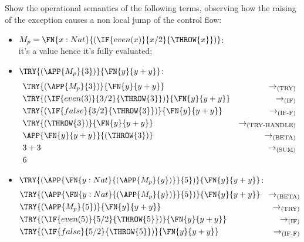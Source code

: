 \subsection{}

Show the operational semantics of the following terms, observing how the raising of the exception causes a
non local jump of the control flow:
\begin{itemize}
	\item $M_p = \FN{x: Nat}{(\IF{even(x)}{x/2}{\THROW{x}})}$:\\
	      it's a value hence it's fully evaluated;
	\item $\TRY{(\APP{M_p}{3})}{\FN{y}{y+y}}$:
	      \begin{align*}
		       & \TRY{(\APP{M_p}{3})}{\FN{y}{y+y}}
		       & \to_{\text{(TRY)}}                                \\
		       & \TRY{(\IF{even(3)}{3/2}{\THROW{3}})}{\FN{y}{y+y}}
		       & \to_{\text{(IF)}}                                 \\
		       & \TRY{(\IF{false}{3/2}{\THROW{3}})}{\FN{y}{y+y}}
		       & \to_{\text{(IF-F)}}                               \\
		       & \TRY{(\THROW{3})}{\FN{y}{y+y}}
		       & \to_{\text{(TRY-HANDLE)}}                         \\
		       & \APP{\FN{y}{y+y}}{(\THROW{3})}
		       & \to_{\text{(BETA)}}                               \\
		       & 3+3
		       & \to_{\text{(SUM)}}                                \\
		       & 6
	      \end{align*}
	\item $\TRY{(\APP{\FN{y:Nat}{(\APP{M_p}{y})}}{5})}{\FN{y}{y+y}}$:
	      \begin{align*}
		       & \TRY{(\APP{\FN{y:Nat}{(\APP{M_p}{y})}}{5})}{\FN{y}{y+y}}
		       & \to_{\text{(BETA)}}                                      \\
		       & \TRY{(\APP{M_p}{5})}{\FN{y}{y+y}}
		       & \to_{\text{(TRY)}}                                       \\
		       & \TRY{(\IF{even(5)}{5/2}{\THROW{5}})}{\FN{y}{y+y}}
		       & \to_{\text{(IF)}}                                        \\
		       & \TRY{(\IF{false}{5/2}{\THROW{5}})}{\FN{y}{y+y}}
		       & \to_{\text{(IF-F)}}                                      \\

\end{align*}
\end{itemize}
